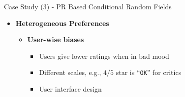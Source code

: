 

\begin{slide}[toc=,bm=]{Case Study (3) - PR Based Conditional Random Fields}
	
	
	\begin{itemize}
		\item  \textbf{Heterogeneous Preferences}
		
		\begin{itemize}
			\item \textbf{User-wise biases}
			\begin{itemize}
				\item Users give lower ratings when in bad mood
				
				\item Different scales, e.g., $4/5$ star is ``\texttt{OK}'' for critics
				
				\item User interface design
				

\end{itemize}
\end{itemize}
\end{itemize}
\end{slide}
